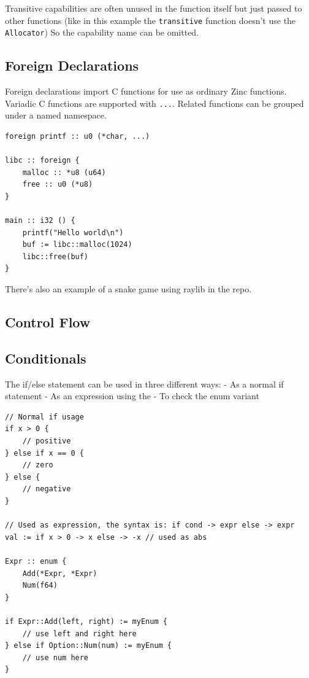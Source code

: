 Transitive capabilities are often unused in the function itself but just passed to other functions (like in this example the \texttt{transitive} function doesn't use the \texttt{Allocator}) So the capability name can be omitted.

\subsection{Foreign Declarations}

Foreign declarations import C functions for use as ordinary Zinc functions.
Variadic C functions are supported with \texttt{...}.
Related functions can be grouped under a named namespace.

\begin{lstlisting}[style=zinc, caption={Foreign declarations}]
foreign printf :: u0 (*char, ...)

libc :: foreign {
    malloc :: *u8 (u64)
    free :: u0 (*u8)
}

main :: i32 () {
    printf("Hello world\n")
    buf := libc::malloc(1024)
    libc::free(buf)
}
\end{lstlisting}

There's also an example of a snake game using raylib in the repo.

\subsection{Control Flow}
\label{sec:flow}

\subsection{Conditionals}
The if/else statement can be used in three different ways:
- As a normal if statement
- As an expression using the \zn{->}
- To check the enum variant

\begin{lstlisting}[style=zinc, caption={if/else}]
// Normal if usage
if x > 0 {
    // positive
} else if x == 0 {
    // zero
} else {
    // negative
}

// Used as expression, the syntax is: if cond -> expr else -> expr
val := if x > 0 -> x else -> -x // used as abs

Expr :: enum {
    Add(*Expr, *Expr)
    Num(f64)
}

if Expr::Add(left, right) := myEnum {
    // use left and right here
} else if Option::Num(num) := myEnum {
    // use num here
}
\end{lstlisting}

